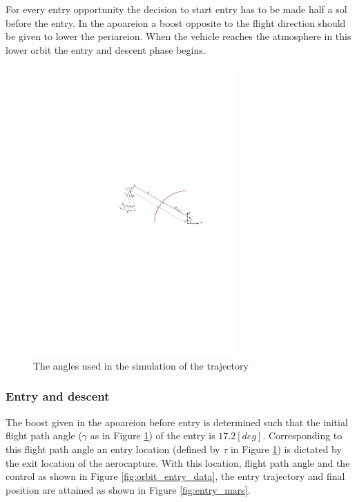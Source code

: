 For every entry opportunity the decision to start entry has to be made half a sol before the entry. In the apoareion a boost opposite to the flight direction should be given to lower the periareion.  When the vehicle reaches the atmosphere in this lower orbit the entry and descent phase begins.

\begin{figure}[h]
	\centering
	\includegraphics[width=0.7\textwidth]{Figure/Orbit/angles.pdf}
	\caption{The angles used in the simulation of the trajectory}
	\label{fig:angles}
\end{figure}

\subsubsection{Entry and descent}\label{sec:entry_descent}
The boost given in the apoareion before entry is determined such that the initial flight path angle ($\gamma$ as in Figure \ref{fig:angles}) of the entry is $17.2 \left[deg\right]$. Corresponding to this flight path angle an entry location (defined by $\tau$ in Figure \ref{fig:angles}) is dictated by the exit location of the aerocapture. With this location, flight path angle and the control as shown in Figure \ref{fig:orbit_entry_data}, the entry trajectory and final position are attained as shown in Figure \ref{fig:entry_mars}.

